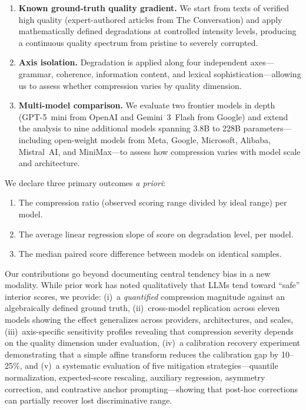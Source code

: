 \documentclass[11pt]{article}
\begin{document}
\begin{enumerate}[nosep]
    \item \textbf{Known ground-truth quality gradient.} We start from texts of verified high quality (expert-authored articles from The Conversation) and apply mathematically defined degradations at controlled intensity levels, producing a continuous quality spectrum from pristine to severely corrupted.
    \item \textbf{Axis isolation.} Degradation is applied along four independent axes---grammar, coherence, information content, and lexical sophistication---allowing us to assess whether compression varies by quality dimension.
    \item \textbf{Multi-model comparison.} We evaluate two frontier models in depth (GPT-5~mini from OpenAI and Gemini~3~Flash from Google) and extend the analysis to nine additional models spanning 3.8B to 228B parameters---including open-weight models from Meta, Google, Microsoft, Alibaba, Mistral~AI, and MiniMax---to assess how compression varies with model scale and architecture.
\end{enumerate}

We declare three primary outcomes \emph{a priori}:
\begin{enumerate}[nosep]
    \item The compression ratio (observed scoring range divided by ideal range) per model.
    \item The average linear regression slope of score on degradation level, per model.
    \item The median paired score difference between models on identical samples.
\end{enumerate}

Our contributions go beyond documenting central tendency bias in a new modality. While prior work has noted qualitatively that LLMs tend toward ``safe'' interior scores, we provide: (i)~a \emph{quantified} compression magnitude against an algebraically defined ground truth, (ii)~cross-model replication across eleven models showing the effect generalizes across providers, architectures, and scales, (iii)~axis-specific sensitivity profiles revealing that compression severity depends on the quality dimension under evaluation, (iv)~a calibration recovery experiment demonstrating that a simple affine transform reduces the calibration gap by 10--25\%, and (v)~a systematic evaluation of five mitigation strategies---quantile normalization, expected-score rescaling, auxiliary regression, asymmetry correction, and contrastive anchor prompting---showing that post-hoc corrections can partially recover lost discriminative range.
\end{document}
